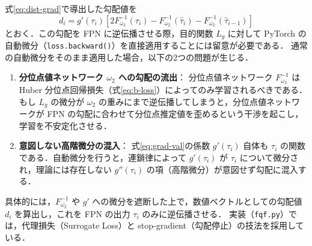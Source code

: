 \documentclass[a4paper,10pt]{jsarticle}
\theoremstyle{definition}
\renewcommand{\Finv}{F^{-1}}
\begin{document}
式\eqref{eq:dist-grad}で導出した勾配値を
\begin{equation}
  d_i = g'(\tau_i)\left[2\Finv_{\omega_2}(\tau_i) - \Finv_{\omega_2}(\hat\tau_i) - \Finv_{\omega_2}(\hat\tau_{i-1})\right]
  \label{eq:grad-val}
\end{equation}
とおく．この勾配を FPN に逆伝播させる際，目的関数 $L_g$ に対して PyTorch の自動微分（\texttt{loss.backward()}）を直接適用することには留意が必要である．
通常の自動微分をそのまま適用した場合，以下の2つの問題が生じる．
\begin{enumerate}
  \item \textbf{分位点値ネットワーク $\omega_2$ への勾配の流出}：
  分位点値ネットワーク $\Finv_{\omega_2}$ は Huber 分位点回帰損失（式\eqref{eq:b-loss}）によってのみ学習されるべきである．もし $L_g$ の微分が $\omega_2$ の重みにまで逆伝播してしまうと，分位点値ネットワークが FPN の勾配に合わせて分位点推定値を歪めるという干渉を起こし，学習を不安定化させる．
  \item \textbf{意図しない高階微分の混入}：
  式\eqref{eq:grad-val}の係数 $g'(\tau_i)$ 自体も $\tau_i$ の関数である．自動微分を行うと，連鎖律によって $g'(\tau_i)$ が $\tau_i$ について微分され，理論には存在しない $g''(\tau_i)$ の項（高階微分）が意図せず勾配に混入する．
\end{enumerate}

具体的には，$\Finv_{\omega_2}$ や $g'$ への微分を遮断した上で，数値ベクトルとしての勾配値 $d_i$ を算出し，これを FPN の出力 $\tau_i$ のみに逆伝播させる．
実装（\texttt{fqf.py}）では，代理損失（Surrogate Loss）と stop-gradient（勾配停止）の技法を採用している．
\end{document}
